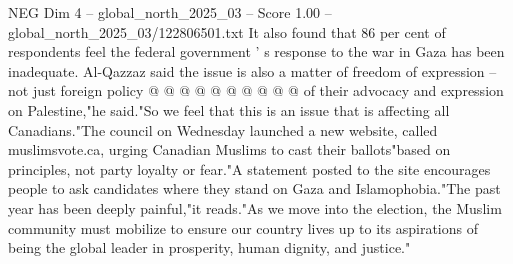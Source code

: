 \begin{textsample}{NEG Dim 4 – global\_north\_2025\_03 – Score 1.00 – global\_north\_2025\_03/122806501.txt}
It also found that 86 per cent of respondents feel the federal government ' s response to the war in Gaza has been inadequate.
Al-Qazzaz said the issue is also a matter of freedom of expression -- not just foreign policy @ @ @ @ @ @ @ @ @ @ of their advocacy and expression on Palestine,"he said."So we feel that this is an issue that is affecting all Canadians."The council on Wednesday launched a new website, called muslimsvote.ca, urging Canadian Muslims to cast their ballots"based on principles, not party loyalty or fear."A statement posted to the site encourages people to ask candidates where they stand on Gaza and Islamophobia."The past year has been deeply painful,"it reads."As we move into the election, the Muslim community must mobilize to ensure our country lives up to its aspirations of being the global leader in prosperity, human dignity, and justice."

\end{textsample}

